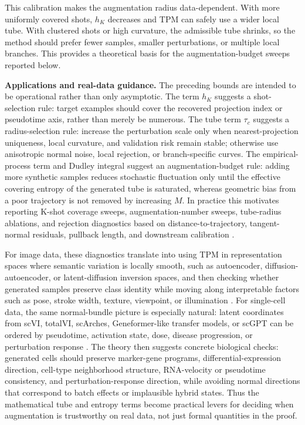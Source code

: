 \documentclass[preprint,12pt,number]{elsarticle}
\begin{document}
This calibration makes the augmentation radius data-dependent. With more uniformly covered shots, $h_K$ decreases and TPM can safely use a wider local tube. With clustered shots or high curvature, the admissible tube shrinks, so the method should prefer fewer samples, smaller perturbations, or multiple local branches. This provides a theoretical basis for the augmentation-budget sweeps reported below.

\smallskip
\noindent\textbf{Applications and real-data guidance.}
The preceding bounds are intended to be operational rather than only asymptotic. The term $h_K$ suggests a shot-selection rule: target examples should cover the recovered projection index or pseudotime axis, rather than merely be numerous. The tube term $\tau_c$ suggests a radius-selection rule: increase the perturbation scale only when nearest-projection uniqueness, local curvature, and validation risk remain stable; otherwise use anisotropic normal noise, local rejection, or branch-specific curves. The empirical-process term and Dudley integral suggest an augmentation-budget rule: adding more synthetic samples reduces stochastic fluctuation only until the effective covering entropy of the generated tube is saturated, whereas geometric bias from a poor trajectory is not removed by increasing $M$. In practice this motivates reporting K-shot coverage sweeps, augmentation-number sweeps, tube-radius ablations, and rejection diagnostics based on distance-to-trajectory, tangent-normal residuals, pullback length, and downstream calibration \citep{dudley1967sizes, vandervaart1996weak, wainwright2019high, niyogi2008finding, genovese2012manifold, aamari2019nonasymptotic}.

For image data, these diagnostics translate into using TPM in representation spaces where semantic variation is locally smooth, such as autoencoder, diffusion-autoencoder, or latent-diffusion inversion spaces, and then checking whether generated samples preserve class identity while moving along interpretable factors such as pose, stroke width, texture, viewpoint, or illumination \citep{hauberg2015principal, arvanitidis2018latent, shao2018riemannian, preechakul2022diffusion, rombach2022high}. For single-cell data, the same normal-bundle picture is especially natural: latent coordinates from scVI, totalVI, scArches, Geneformer-like transfer models, or scGPT can be ordered by pseudotime, activation state, dose, disease progression, or perturbation response \citep{lopez2018deep, gayoso2021joint, lotfollahi2022mapping, theodoris2023transfer, cui2024scgpt, trapnell2014dynamics, wolf2019paga, moon2019phate, bergen2020generalizing}. The theory then suggests concrete biological checks: generated cells should preserve marker-gene programs, differential-expression direction, cell-type neighborhood structure, RNA-velocity or pseudotime consistency, and perturbation-response direction, while avoiding normal directions that correspond to batch effects or implausible hybrid states. Thus the mathematical tube and entropy terms become practical levers for deciding when augmentation is trustworthy on real data, not just formal quantities in the proof.
\end{document}
